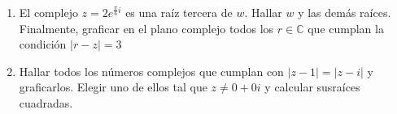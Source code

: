 \documentclass[a4paper]{article}
\begin{document}
\begin{enumerate}
\begin{enumerate} [label=(\alph*)]
		\item El complejo $z=2e^{\frac{\pi}{6}i}$ es una raíz tercera de $w$. Hallar $w$ y las demás raíces. Finalmente, graficar en el plano complejo todos los $r\in\mathbb{C}$ que cumplan la condición $|r-z|=3$
		
		\item Hallar todos los números complejos que cumplan con $|z-1|=|z-i|$ y graficarlos. Elegir uno de ellos tal que $z\neq 0+0i$ y calcular susraíces cuadradas.

	\end{enumerate}


\end{enumerate}
\end{document}
